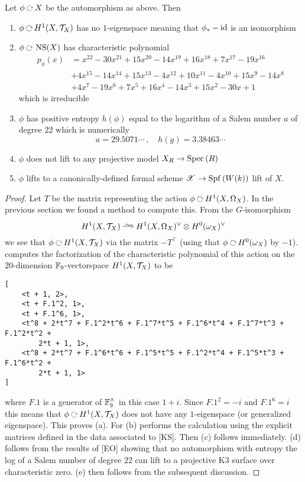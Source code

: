 \documentclass[12pt]{article}
\newcommand{\Spf}[1]{\mathrm{Spf}\left( #1 \right)}
\begin{document}
\begin{thm}
Let $\phi \acts X$ be the automorphism as above. Then
\begin{enumerate}
\item $\phi \acts H^1(X, \T_X)$ has no $1$-eigenspace meaning that $\phi_* - \mathrm{id}$ is an isomorphism

\item $\phi \acts \NS(X)$ has characteristic polynomial
\begin{align*}
p_{\phi}(x) &= x^{22}-30 x^{21}+15 x^{20}-14 x^{19}+16 x^{18}+7 x^{17}-19
   x^{16}
   \\
   & + 4 x^{15}-14 x^{14}+15 x^{13}-4 x^{12}+10 x^{11}-4
   x^{10}+15 x^9-14 x^8
   \\
   & + 4 x^7-19 x^6+7 x^5+16 x^4-14 x^3+15
   x^2-30 x+1
\end{align*}
which is irreducible

\item $\phi$ has positive entropy $h(\phi)$ equal to the logarithm of a Salem number $a$ of degree $22$ which is numerically
\[ a = 29.5071\cdots \, , \quad h(g) = 3.38463 \cdots \]
\item $\phi$ does not lift to any projective model $X_R \to \mathrm{Spec}\left( R \right)$

\item $\phi$ lifts to a canonically-defined formal scheme $\X \to \Spf{W(k)}$ lift of $X$.
\end{enumerate}
\end{thm}

\begin{proof}
Let $T$ be the matrix representing the action $\phi \acts H^1(X, \Omega_X)$. In the previous section we found a method to compute this. From the $G$-isomorphism
\[ H^1(X, \T_X) \iso H^1(X, \Omega_X)^{\vee} \ot H^0(\omega_X)^{\vee} \]
we see that $\phi \acts H^1(X, \T_X)$ via the matrix $-T^{\top}$ (using that $\phi \acts H^0(\omega_X)$ by $-1$). \magma computes the factorization of the characteristic polynomial of this action on the $20$-dimension $\mathbb{F}_9$-vectorspace $H^1(X, \mathcal{T}_X)$ to be 
\begin{verbatim}
[
    <t + 1, 2>,
    <t + F.1^2, 1>,
    <t + F.1^6, 1>,
    <t^8 + 2*t^7 + F.1^2*t^6 + F.1^7*t^5 + F.1^6*t^4 + F.1^7*t^3 + F.1^2*t^2 + 
        2*t + 1, 1>,
    <t^8 + 2*t^7 + F.1^6*t^6 + F.1^5*t^5 + F.1^2*t^4 + F.1^5*t^3 + F.1^6*t^2 + 
        2*t + 1, 1>
]
\end{verbatim}
where $F.1$ is a generator of $\mathbb{F}_9^\times$ in this case $1 + i$. Since $F.1^2 = -i$ and $F.1^6 = i$ this means that $\phi \acts H^1(X, \T_X)$ does not have any $1$-eigenspace (or generalized eigenspace). This proves (a). For (b) \magma performs the calculation using the explicit matrices defined in the data associated to [KS]. Then (c) follows immediately. (d) follows from the results of [EO] showing that no automorphism with entropy the log of a Salem number of degree $22$ can lift to a projective K3 surface over characteristic zero. (e) then follows from the subsequent discussion. 
\end{proof}
\end{document}
